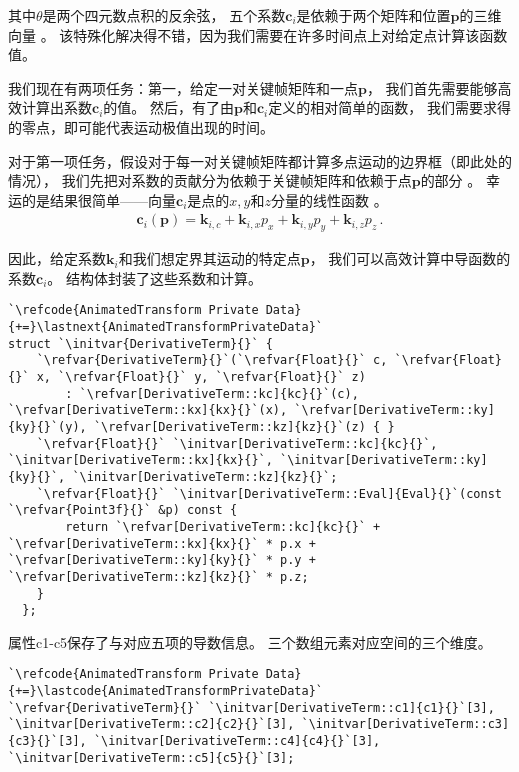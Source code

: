 其中$\theta$是两个四元数点积的反余弦，
五个系数$\bm c_i$是依赖于两个矩阵和位置$\bm p$的三维向量
。
该特殊化解决得不错，因为我们需要在许多时间点上对给定点计算该函数值。

我们现在有两项任务：第一，给定一对关键帧矩阵和一点$\bm p$，
我们首先需要能够高效计算出系数$\bm c_i$的值。
然后，有了由$\bm p$和$\bm c_i$定义的相对简单的函数，
我们需要求得的零点，即可能代表运动极值出现的时间。

对于第一项任务，假设对于每一对关键帧矩阵都计算多点运动的边界框（即此处的情况），
我们先把对系数的贡献分为依赖于关键帧矩阵和依赖于点$\bm p$的部分
。
幸运的是结果很简单——向量$\bm c_i$是点的$x,y$和$z$分量的线性函数
。
\begin{align*}
    \bm c_i(\bm p)=\bm k_{i,c}+\bm k_{i,x}p_x+\bm k_{i,y}p_y+\bm k_{i,z}p_z\, .
\end{align*}

因此，给定系数$\bm k_i$和我们想定界其运动的特定点$\bm p$，
我们可以高效计算中导函数的系数$\bm c_i$。
结构体封装了这些系数和计算。
\begin{lstlisting}
`\refcode{AnimatedTransform Private Data}{+=}\lastnext{AnimatedTransformPrivateData}`
struct `\initvar{DerivativeTerm}{}` {
    `\refvar{DerivativeTerm}{}`(`\refvar{Float}{}` c, `\refvar{Float}{}` x, `\refvar{Float}{}` y, `\refvar{Float}{}` z)
        : `\refvar[DerivativeTerm::kc]{kc}{}`(c), `\refvar[DerivativeTerm::kx]{kx}{}`(x), `\refvar[DerivativeTerm::ky]{ky}{}`(y), `\refvar[DerivativeTerm::kz]{kz}{}`(z) { }
    `\refvar{Float}{}` `\initvar[DerivativeTerm::kc]{kc}{}`, `\initvar[DerivativeTerm::kx]{kx}{}`, `\initvar[DerivativeTerm::ky]{ky}{}`, `\initvar[DerivativeTerm::kz]{kz}{}`;
    `\refvar{Float}{}` `\initvar[DerivativeTerm::Eval]{Eval}{}`(const `\refvar{Point3f}{}` &p) const {
        return `\refvar[DerivativeTerm::kc]{kc}{}` + `\refvar[DerivativeTerm::kx]{kx}{}` * p.x + `\refvar[DerivativeTerm::ky]{ky}{}` * p.y + `\refvar[DerivativeTerm::kz]{kz}{}` * p.z;
    }
  };
\end{lstlisting}

属性{\ttfamily c1}-{\ttfamily c5}保存了与对应五项的导数信息。
三个数组元素对应空间的三个维度。
\begin{lstlisting}
`\refcode{AnimatedTransform Private Data}{+=}\lastcode{AnimatedTransformPrivateData}`
`\refvar{DerivativeTerm}{}` `\initvar[DerivativeTerm::c1]{c1}{}`[3], `\initvar[DerivativeTerm::c2]{c2}{}`[3], `\initvar[DerivativeTerm::c3]{c3}{}`[3], `\initvar[DerivativeTerm::c4]{c4}{}`[3], `\initvar[DerivativeTerm::c5]{c5}{}`[3];
\end{lstlisting}

